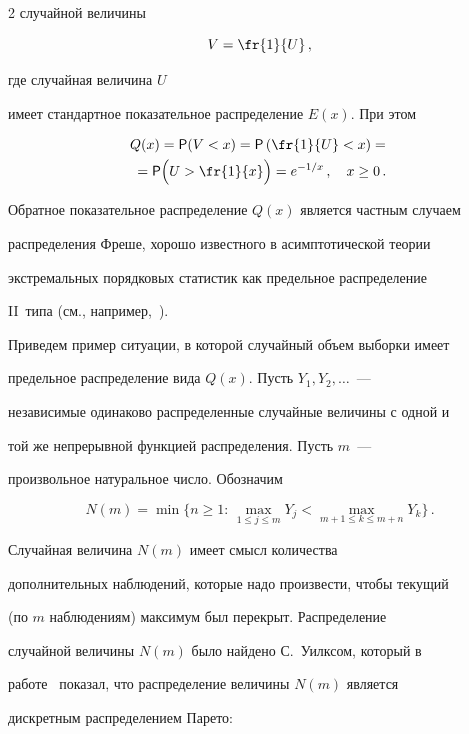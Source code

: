 \begin{multicols}{2}
случайной величины


$$


V=\fr{1}{U}\,,


$$


где случайная величина $U$


имеет стандартное показательное распределение $E(x)$. При этом


\begin{multline*}


Q(x)={\sf P}(V<x)={\sf P}\left(\fr{1}{U}<x\right)={}\\


{}={\sf P}\Big(U>\fr{1}{x}\Big)=e^{-1/x}\,,\quad x\ge0\,.


\end{multline*}


Обратное показательное распределение $Q(x)$ является частным случаем


распределения Фреше, хорошо известного в асимптотической теории


экстремальных порядковых статистик как предельное распределение


II~типа (см., например,~\cite{7be}).





Приведем пример ситуации, в которой случайный объем выборки имеет


предельное распределение вида $Q(x)$. Пусть $Y_1,Y_2,\ldots$~---


независимые одинаково распределенные случайные величины с одной и


той же непрерывной функцией распределения. Пусть $m$~---


произвольное натуральное число. Обозначим


$$


N(m)=\min\big\{n\ge1:\,\max_{1\le j\le m}Y_j<\max_{m+1\le k\le


m+n}Y_k\big\}\,.


$$


Случайная величина $N(m)$ имеет смысл количества


дополнительных наблюдений, которые надо произвести, чтобы текущий


(по $m$ наблюдениям) максимум был перекрыт. Распределение


случайной величины $N(m)$ было найдено С.~Уилксом, который в


работе~\cite{54be} показал, что распределение величины $N(m)$ является


дискретным распределением Парето:



\end{multicols}
